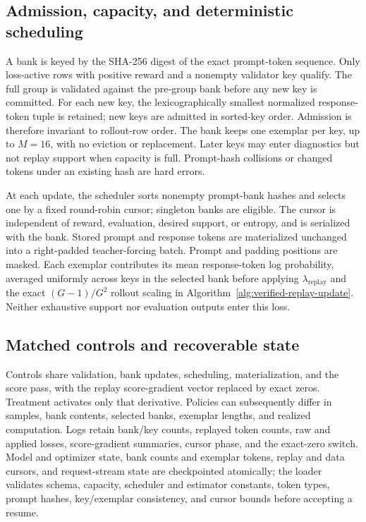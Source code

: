 \subsection{Admission, capacity, and deterministic scheduling}
\label{app:algorithm-bank}

A bank is keyed by the SHA-256 digest of the exact prompt-token sequence.
Only loss-active rows with positive reward and a nonempty validator key
qualify. The full group is validated against the pre-group bank before
any new key is committed. For each new key, the lexicographically smallest
normalized response-token tuple is retained; new keys are admitted in
sorted-key order. Admission is therefore invariant to rollout-row order.
The bank keeps one exemplar per key, up to $M=16$, with no eviction or
replacement. Later keys may enter diagnostics but not replay support when
capacity is full. Prompt-hash collisions or changed tokens under an
existing hash are hard errors.

\label{app:algorithm-schedule}
At each update, the scheduler sorts nonempty prompt-bank hashes and selects
one by a fixed round-robin cursor; singleton banks are eligible. The cursor
is independent of reward, evaluation, desired support, or entropy, and is
serialized with the bank. Stored prompt and response tokens are
materialized unchanged into a right-padded teacher-forcing batch. Prompt
and padding positions are masked. Each exemplar contributes its mean
response-token log probability, averaged uniformly across keys in the
selected bank before applying $\lambda_{\mathrm{replay}}$ and the exact
$(G-1)/G^2$ rollout scaling in
Algorithm~\ref{alg:verified-replay-update}. Neither exhaustive support nor
evaluation outputs enter this loss.

\subsection{Matched controls and recoverable state}
\label{app:algorithm-control}

Controls share validation, bank updates, scheduling, materialization, and
the score pass, with the replay score-gradient vector replaced by exact
zeros. Treatment activates only that derivative. Policies can subsequently
differ in samples, bank contents, selected banks, exemplar lengths, and
realized computation. Logs retain bank/key counts, replayed token counts,
raw and applied losses, score-gradient summaries, cursor phase, and the
exact-zero switch. Model and optimizer state, bank counts and exemplar
tokens, replay and data cursors, and request-stream state are checkpointed
atomically; the loader validates schema, capacity, scheduler and estimator
constants, token types, prompt hashes, key/exemplar consistency, and cursor
bounds before accepting a resume.

